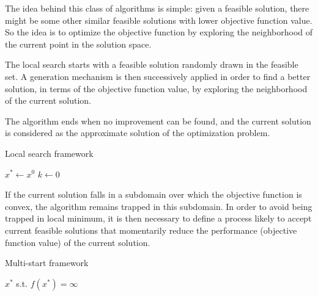 The idea behind this class of algorithms is simple: given a feasible solution, there might be some other similar feasible solutions with lower objective function value. So the idea is to optimize the objective function by exploring the neighborhood of the current point in the solution space.

The local search starts with a feasible solution randomly drawn in the feasible set. A generation mechanism is then successively applied in order to find a better solution, in terms of the objective function value, by exploring the neighborhood of the current solution.

The algorithm ends when no improvement can be found, and the current solution is considered as the approximate solution of the optimization problem.


\begin{algorithm}\caption{Local search framework}\label{alg:local-search}
	$x^\ast\gets x^0$\;
	$k\gets 0$\;
\end{algorithm}

If the current solution falls in a subdomain over which the objective function is convex, the algorithm remains trapped in this subdomain. In order to avoid being trapped in local minimum, it is then necessary to define a process likely to accept current feasible solutions that momentarily reduce the performance (objective function value) of the current solution.


\begin{algorithm}\caption{Multi-start framework}\label{alg:multi-start}
	$x^\ast$ s.t. $f(x^\ast)=\infty$\;
\end{algorithm}



